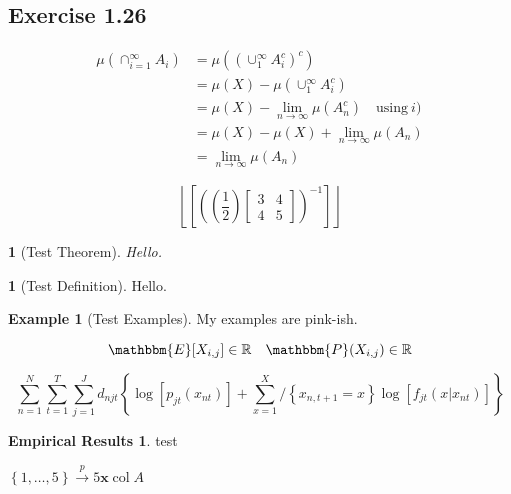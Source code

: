 \documentclass[11pt]{article}
\numberwithin{equation}{section}
\theoremstyle{plain}
\newtheorem{theorem}{\color{ForestGreen}{\textbf{Theorem}}}[section]
\theoremstyle{definition}
\newtheorem{definition}{\color{MidnightBlue}{\textbf{Definition}}}[section]
\newtheorem{example}{\color{WildStrawberry}Example}[section]
\newtheorem*{eresults}{Empirical Results}
\newcommand\parens[1]{\left( #1 \right)}
\newcommand\squares[1]{\left[ #1 \right]}
\newcommand\braces[1]{\left\{ #1 \right\}}
\newcommand\floor[1]{\left\lfloor #1 \right\rfloor}
\newcommand\vect[1]{\mathbf{#1}}
\newcommand\inv[1]{#1^{-1}}
\def\Set{\set*}%
\newcommand\intsfin[1]{\braces{1, \ldots, #1}}
\newcommand{\toprob}{\stackrel { p } {\to} }
\newcommand{\1}{\mathbbm 1}
\def\vx{\vect{x}}
\newcommand{\RR}{\mathbb R}
\newcommand{\ee}[1]{\mathbbm{E}[{#1}]}
\newcommand{\pp}[1]{\mathbbm{P}({#1})}
\def\cA{\col{A}}
\DeclareMathOperator{\col}{col}
\begin{document}
\subsection*{Exercise 1.26}
	\begin{align*}
	\mu (\cap^\infty_{i=1} A_i) &= \mu \parens{\parens{\cup^\infty_1 A^c_i}^c} \\
						   &=  \mu (X) - \mu \parens{\cup^\infty_1 A^c_i}\\
						   &= \mu (X) - \lim_{n \to \infty} \mu \parens{A^c_n} \quad \text{using} \ i) \\
						   &= \mu (X) - \mu (X) +\lim_{n \to \infty} \mu \parens{A_n} \\
						   &=  \lim_{n \to \infty} \mu \parens{A_n}
	\end{align*}


\newpage


\begin{equation}
	\floor{\squares{\inv{\parens{\parens{\frac{1}{2}} \begin{bmatrix} 3 & 4 \\ 4 & 5\end{bmatrix} }}}}
\end{equation}


\begin{theorem}[Test Theorem]
	Hello.
\end{theorem}

\begin{definition}[Test Definition]
	Hello.
\end{definition}

\begin{example}[Test Examples]
	My examples are pink-ish.
\end{example}

\begin{equation}
	\ee{X_{i,j}} \in \RR \quad \pp{X_{i,j}} \in \RR
\end{equation}



\begin{equation}
\sum_{n=1}^{N} \sum_{t=1}^{T} \sum_{j=1}^{J} d_{n j t}\left\{\log \left[p_{j t}\left(x_{n t}\right)\right]+\sum_{x=1}^{X} /\left\{x_{n, t+1}=x\right\} \log \left[f_{j t}\left(x | x_{n t}\right)\right]\right\}
\end{equation}

\begin{eresults}
test
\end{eresults}

$\intsfin{5} \toprob{5} \vx \cA$


\newpage 
\listoftodos
\end{document}
